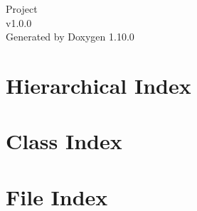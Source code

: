 \documentclass[twoside]{book}
\newcommand{\+}{\discretionary{\mbox{\scriptsize$\hookleftarrow$}}{}{}}
\newcommand{\clearemptydoublepage}{%
    \newpage{\pagestyle{empty}\cleardoublepage}%
  }
\begin{document}
  \raggedbottom
    \hypersetup{pageanchor=false,
                bookmarksnumbered=true,
                pdfencoding=unicode
               }
  \begin{titlepage}
  \vspace*{7cm}
  \begin{center}%
  {\Large Project}\\
  [1ex]\large v1.\+0.\+0 \\
  \vspace*{1cm}
  {\large Generated by Doxygen 1.10.0}\\
  \end{center}
  \end{titlepage}
  \clearemptydoublepage
  \tableofcontents
  \clearemptydoublepage
  \hypersetup{pageanchor=true}

\chapter{Hierarchical Index}

\chapter{Class Index}

\chapter{File Index}

\end{document}
